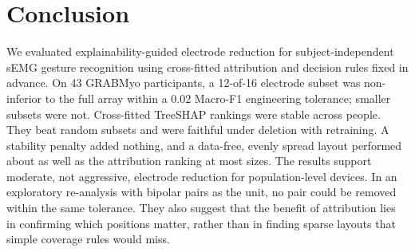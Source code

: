 \section{Conclusion}
\label{sec:conclusion}

We evaluated explainability-guided electrode reduction for subject-independent sEMG gesture recognition using cross-fitted attribution and decision rules fixed in advance. On 43 GRABMyo participants, a 12-of-16 electrode subset was non-inferior to the full array within a 0.02 Macro-F1 engineering tolerance; smaller subsets were not. Cross-fitted TreeSHAP rankings were stable across people. They beat random subsets and were faithful under deletion with retraining. A stability penalty added nothing, and a data-free, evenly spread layout performed about as well as the attribution ranking at most sizes. The results support moderate, not aggressive, electrode reduction for population-level devices. In an exploratory re-analysis with bipolar pairs as the unit, no pair could be removed within the same tolerance. They also suggest that the benefit of attribution lies in confirming which positions matter, rather than in finding sparse layouts that simple coverage rules would miss.
